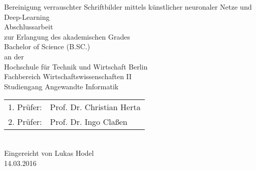 


\begin{titlepage}
  \begin{center}
    \huge
    Bereinigung verrauschter Schriftbilder mittels künstlicher neuronaler Netze und Deep-Learning\\
    \vspace{1cm}\huge
    Abschlussarbeit\\
    \vspace{1cm}\large
    {\large zur Erlangung des akademischen Grades}\\
    {\large Bachelor of Science (B.SC.)}\\
    \vspace{1cm}\large
    {\large an der}\\
    \vspace{1cm}\large
		{\large Hochschule für Technik und Wirtschaft Berlin}\\
    {\large Fachbereich Wirtschaftswissenschaften II}\\
    {\large Studiengang Angewandte Informatik}\\
    \vspace{1cm}\large
    \begin{tabular}{ll}
      1. Prüfer:            & Prof. Dr. Christian Herta\\
      2. Prüfer:            & Prof. Dr. Ingo Claßen\\
    \end{tabular}
    \vspace{1cm}\large
    \\
		Eingereicht von Lukas Hodel\\
    \vspace{1cm}\large
    14.03.2016

  \end{center}

\end{titlepage}
